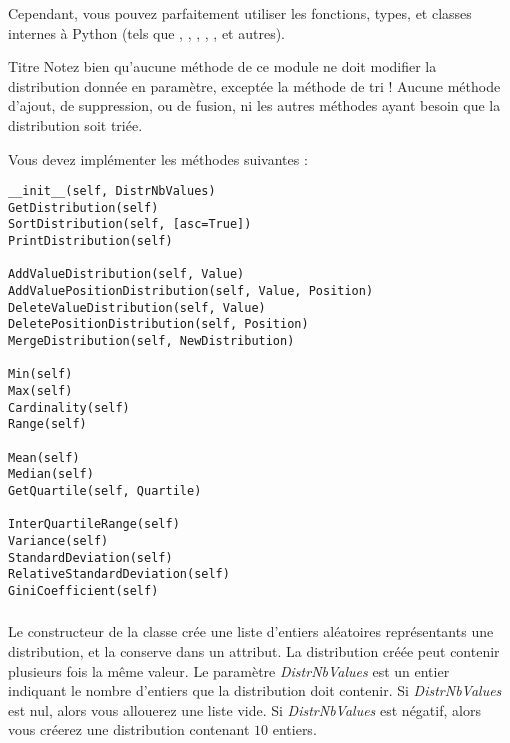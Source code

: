 \bigskip

\noindent Cependant, vous pouvez parfaitement utiliser les fonctions, types, et classes internes à Python (tels que , , , , , et autres).

\bigskip

\begin{RedBoxTitle}{Titre}
Notez bien qu'aucune méthode de ce module ne doit modifier la distribution donnée en paramètre, exceptée la méthode de tri !
Aucune méthode d'ajout, de suppression, ou de fusion, ni les autres méthodes ayant besoin que la distribution soit triée.
\end{RedBoxTitle}

\newpage

\noindent Vous devez implémenter les méthodes suivantes :

\bigskip

\lstset{language=python}
\begin{lstlisting}[frame=single,title={Liste des méthodes pour la classe de statistiques}]
__init__(self, DistrNbValues)
GetDistribution(self)
SortDistribution(self, [asc=True])
PrintDistribution(self)

AddValueDistribution(self, Value)
AddValuePositionDistribution(self, Value, Position)
DeleteValueDistribution(self, Value)
DeletePositionDistribution(self, Position)
MergeDistribution(self, NewDistribution)

Min(self)
Max(self)
Cardinality(self)
Range(self)

Mean(self)
Median(self)
GetQuartile(self, Quartile)

InterQuartileRange(self)
Variance(self)
StandardDeviation(self)
RelativeStandardDeviation(self)
GiniCoefficient(self)
\end{lstlisting}


\bigskip


\subsubsection*{}

\noindent Le constructeur de la classe crée une liste d'entiers aléatoires représentants une distribution, et la conserve dans un attribut.
La distribution créée peut contenir plusieurs fois la même valeur.
Le paramètre \textit{DistrNbValues} est un entier indiquant le nombre d'entiers que la distribution doit contenir.
Si \textit{DistrNbValues} est nul, alors vous allouerez une liste vide.
Si \textit{DistrNbValues} est négatif, alors vous créerez une distribution contenant $ 10 $ entiers.


